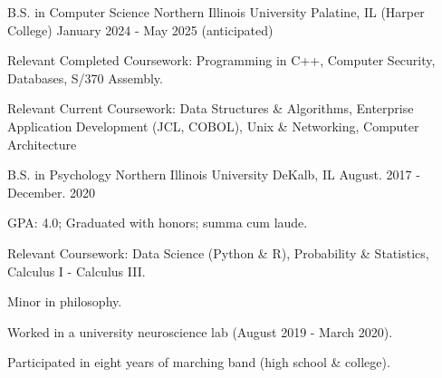 

\begin{cventries}

  \cventry
  {B.S. in Computer Science} %
  {Northern Illinois University} %
    {Palatine, IL (Harper College)} %
    {January 2024 - May 2025 (anticipated)} %
    {
      \begin{cvitems} %
        \item {Relevant Completed Coursework: Programming in C++, Computer Security, Databases, S/370 Assembly.}
        \item {Relevant Current Coursework: Data Structures \& Algorithms, Enterprise Application Development (JCL, COBOL), Unix \& Networking, Computer Architecture}
      \end{cvitems}
    }

  \cventry
  {B.S. in Psychology} %
  {Northern Illinois University} %
    {DeKalb, IL} %
    {August. 2017 - December. 2020} %
    {
      \begin{cvitems} %
        \item {GPA: 4.0; Graduated with honors; summa cum laude.}
        \item {Relevant Coursework: Data Science (Python \& R), Probability \& Statistics, Calculus I - Calculus III.}
        \item {Minor in philosophy.}
        \item {Worked in a university neuroscience lab (August 2019 - March 2020).}
        \item {Participated in eight years of marching band (high school \& college).}
      \end{cvitems}
    }

\end{cventries}
